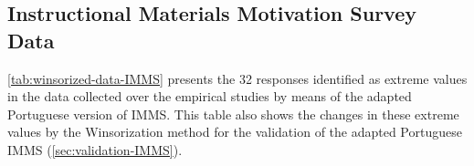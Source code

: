 \subsection{Instructional Materials Motivation Survey Data}

\autoref{tab:winsorized-data-IMMS} presents the 32 responses identified as extreme values in the data collected over the empirical studies by means of the adapted Portuguese version of IMMS. This table also shows the changes in these extreme values by the Winsorization method for the validation of the adapted Portuguese IMMS (\autoref{sec:validation-IMMS}).

